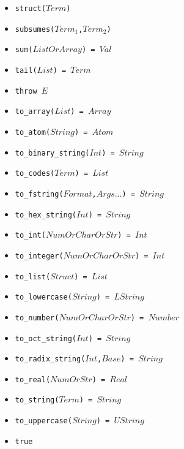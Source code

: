 \documentclass[10pt]{article}
\begin{document}
\begin{multicols}{2}
\begin{scriptsize}
\begin{itemize}
    \item \texttt{struct($Term$)} 
    \item \texttt{subsumes($Term_1$,$Term_2$)}
    \item \texttt{sum($ListOrArray$) = $Val$}
    \item \texttt{tail($List$) = $Term$} 
    \item \texttt{throw $E$}    
    \item \texttt{to\_array($List$) = $Array$} 
    \item \texttt{to\_atom($String$) = $Atom$} 
    \item \texttt{to\_binary\_string($Int$) = $String$}
    \item \texttt{to\_codes($Term$) = $List$}        
    \item \texttt{to\_fstring($Format$,$Args\ldots$) = $String$}
    \item \texttt{to\_hex\_string($Int$) = $String$}    
    \item \texttt{to\_int($NumOrCharOrStr$) = $Int$} 
    \item \texttt{to\_integer($NumOrCharOrStr$) = $Int$} 
    \item \texttt{to\_list($Struct$) = $List$} 
    \item \texttt{to\_lowercase($String$) = $LString$}
    \item \texttt{to\_number($NumOrCharOrStr$) = $Number$}
    \item \texttt{to\_oct\_string($Int$) = $String$}    
    \item \texttt{to\_radix\_string($Int$,$Base$) = $String$}
    \item \texttt{to\_real($NumOrStr$) = $Real$} 
    \item \texttt{to\_string($Term$) = $String$}        
    \item \texttt{to\_uppercase($String$) = $UString$}
    \item \texttt{true}

\end{itemize}
\end{scriptsize}
\end{multicols}
\end{document}
